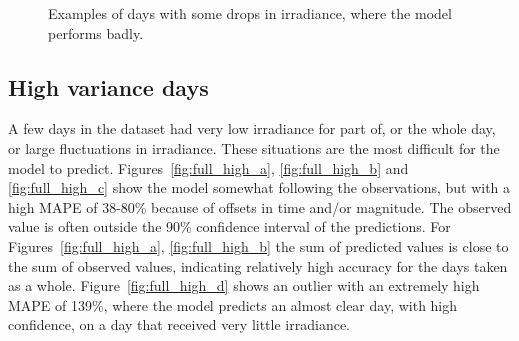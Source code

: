 {\begin{figure}
    \caption{Examples of days with some drops in irradiance, where the model performs badly.
    \label{fig:full_med_bad}}
\end{figure}
\clearpage
}

\clearpage
\subsection{High variance days}
A few days in the dataset had very low irradiance for part of, or the whole day, or large fluctuations in irradiance. These situations are the most difficult for the model to predict. Figures~\ref{fig:full_high_a}, \ref{fig:full_high_b} and \ref{fig:full_high_c} show the model somewhat following the observations, but with a high MAPE of 38-80\% because of offsets in time and/or magnitude. The observed value is often outside the 90\% confidence interval of the predictions. For Figures~\ref{fig:full_high_a}, \ref{fig:full_high_b} the sum of predicted values is close to the sum of observed values, indicating relatively high accuracy for the days taken as a whole. Figure~\ref{fig:full_high_d} shows an outlier with an extremely high MAPE of 139\%, where the model predicts an almost clear day, with high confidence, on a day that received very little irradiance.
